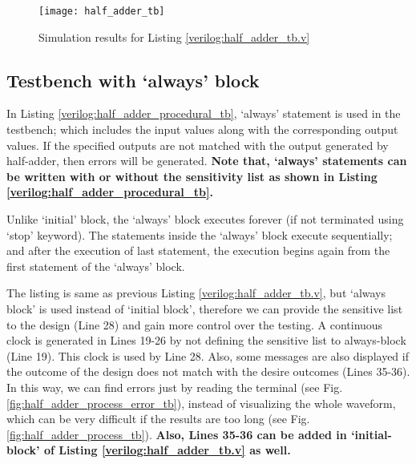 

\begin{figure}[!h]
	\centering
	\texttt{[image: half\_adder\_tb]}
	\caption{Simulation results for Listing \ref{verilog:half_adder_tb.v}}
	\label{fig:half_adder_tb}
\end{figure}
%
%
\subsection{Testbench with `always' block} \label{sec:tb_with_process_statement}
In Listing \ref{verilog:half_adder_procedural_tb}, `always' statement is used in the testbench; which includes the input values along with the corresponding output values.  If the specified outputs are not matched with the output generated by half-adder, then errors will be generated. \textbf{Note that, `always' statements can be written with or without the sensitivity list as shown in Listing \ref{verilog:half_adder_procedural_tb}.}
\begin{noNumBox}
	Unlike `initial' block, the `always' block executes forever (if not terminated using `stop' keyword). The statements inside the `always' block execute sequentially; and after the execution of last statement, the execution begins again from the first statement of the `always' block. 
\end{noNumBox}
%
\begin{explanation}
	The listing is same as previous Listing \ref{verilog:half_adder_tb.v}, but `always block' is used instead of `initial block', therefore we can provide the sensitive list to the design (Line 28) and gain more control over the testing. A continuous clock is generated in Lines 19-26 by not defining the sensitive list to always-block (Line 19). This clock is used by Line 28. Also, some messages are also displayed if the outcome of the design does not match with the desire outcomes (Lines 35-36). In this way, we can find errors just by reading the terminal (see Fig. \ref{fig:half_adder_process_error_tb}), instead of visualizing the whole waveform, which can be very difficult if the results are too long (see Fig. \ref{fig:half_adder_process_tb}). \textbf{Also, Lines 35-36 can be added in `initial-block' of Listing \ref{verilog:half_adder_tb.v} as well.}
\end{explanation}

